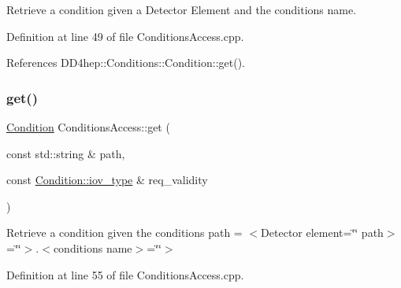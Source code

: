Retrieve a condition given a Detector Element and the conditions name. 



Definition at line 49 of file Conditions\+Access.\+cpp.



References D\+D4hep\+::\+Conditions\+::\+Condition\+::get().

\hypertarget{class_d_d4hep_1_1_conditions_1_1_conditions_access_abadda777e6c3ef97bd6675fdceda2630}{}\label{class_d_d4hep_1_1_conditions_1_1_conditions_access_abadda777e6c3ef97bd6675fdceda2630} 
\subsubsection{\texorpdfstring{get()}{get()}\hspace{0.1cm}{\footnotesize\ttfamily [2/2]}}
{\footnotesize\ttfamily \hyperlink{class_d_d4hep_1_1_conditions_1_1_condition}{Condition} Conditions\+Access\+::get (\begin{DoxyParamCaption}\item[{const std\+::string \&}]{path,  }\item[{const \hyperlink{class_d_d4hep_1_1_conditions_1_1_condition_ad84300e226b2085ec5e9db7f47be5539}{Condition\+::iov\+\_\+type} \&}]{req\+\_\+validity }\end{DoxyParamCaption})}



Retrieve a condition given the conditions path = $<$\+Detector element=\char`\"{}\char`\"{} path$>$=\char`\"{}\char`\"{}$>$.$<$conditions name$>$=\char`\"{}\char`\"{}$>$ 



Definition at line 55 of file Conditions\+Access.\+cpp.

\hypertarget{class_d_d4hep_1_1_conditions_1_1_conditions_access_aa5f5712c3083cec42a3cd49d86924611}{}\label{class_d_d4hep_1_1_conditions_1_1_conditions_access_aa5f5712c3083cec42a3cd49d86924611} 
